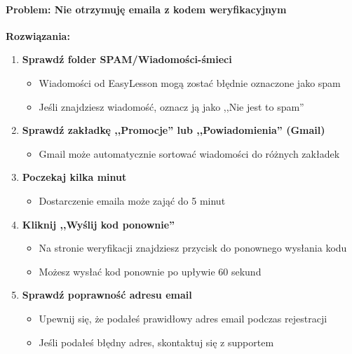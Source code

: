 \documentclass[12pt,a4paper]{article}
\begin{document}
\paragraph{Problem: Nie otrzymuję emaila z kodem weryfikacyjnym}

\textbf{Rozwiązania:}

\begin{enumerate}
    \item \textbf{Sprawdź folder SPAM/Wiadomości-śmieci}
    \begin{itemize}
        \item Wiadomości od EasyLesson mogą zostać błędnie oznaczone jako spam
        \item Jeśli znajdziesz wiadomość, oznacz ją jako ,,Nie jest to spam''
    \end{itemize}
    
    \item \textbf{Sprawdź zakładkę ,,Promocje'' lub ,,Powiadomienia'' (Gmail)}
    \begin{itemize}
        \item Gmail może automatycznie sortować wiadomości do różnych zakładek
    \end{itemize}
    
    \item \textbf{Poczekaj kilka minut}
    \begin{itemize}
        \item Dostarczenie emaila może zająć do 5 minut
    \end{itemize}
    
    \item \textbf{Kliknij ,,Wyślij kod ponownie''}
    \begin{itemize}
        \item Na stronie weryfikacji znajdziesz przycisk do ponownego wysłania kodu
        \item Możesz wysłać kod ponownie po upływie 60 sekund
    \end{itemize}
    
    \item \textbf{Sprawdź poprawność adresu email}
    \begin{itemize}
        \item Upewnij się, że podałeś prawidłowy adres email podczas rejestracji
        \item Jeśli podałeś błędny adres, skontaktuj się z supportem
    \end{itemize}
\end{enumerate}
\end{document}
